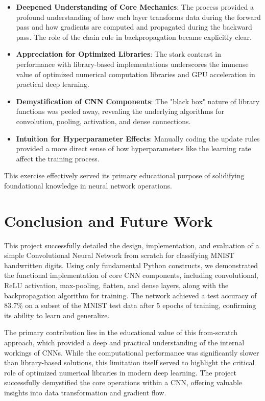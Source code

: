 \documentclass[conference]{IEEEtran}
\begin{document}
\begin{itemize}
    \item \textbf{Deepened Understanding of Core Mechanics}: The process provided a profound understanding of how each layer transforms data during the forward pass and how gradients are computed and propagated during the backward pass. The role of the chain rule in backpropagation became explicitly clear.
    \item \textbf{Appreciation for Optimized Libraries}: The stark contrast in performance with library-based implementations underscores the immense value of optimized numerical computation libraries and GPU acceleration in practical deep learning.
    \item \textbf{Demystification of CNN Components}: The "black box" nature of library functions was peeled away, revealing the underlying algorithms for convolution, pooling, activation, and dense connections.
    \item \textbf{Intuition for Hyperparameter Effects}: Manually coding the update rules provided a more direct sense of how hyperparameters like the learning rate affect the training process.
\end{itemize}
This exercise effectively served its primary educational purpose of solidifying foundational knowledge in neural network operations.

\section{Conclusion and Future Work}
This project successfully detailed the design, implementation, and evaluation of a simple Convolutional Neural Network from scratch for classifying MNIST handwritten digits. Using only fundamental Python constructs, we demonstrated the functional implementation of core CNN components, including convolutional, ReLU activation, max-pooling, flatten, and dense layers, along with the backpropagation algorithm for training. The network achieved a test accuracy of 83.7\% on a subset of the MNIST test data after 5 epochs of training, confirming its ability to learn and generalize.

The primary contribution lies in the educational value of this from-scratch approach, which provided a deep and practical understanding of the internal workings of CNNs. While the computational performance was significantly slower than library-based solutions, this limitation itself served to highlight the critical role of optimized numerical libraries in modern deep learning. The project successfully demystified the core operations within a CNN, offering valuable insights into data transformation and gradient flow.
\end{document}

